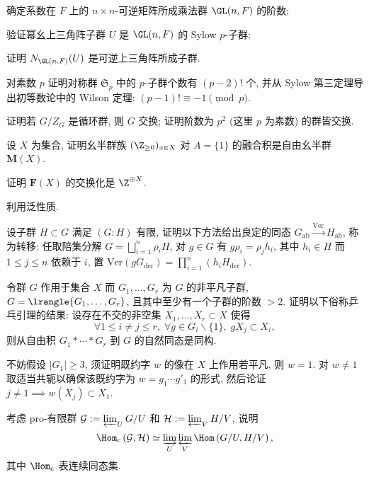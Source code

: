 \begin{Exercises}
		\begin{compactenum}[(i)]
			\item 确定系数在 $F$ 上的 $n \times n$-可逆矩阵所成乘法群 $\GL(n, F)$ 的阶数;
			\item 验证幂幺上三角阵子群 $U$ 是 $\GL(n,F)$ 的 Sylow $p$-子群;
			\item 证明 $N_{\GL(n,F)}(U)$ 是可逆上三角阵所成子群.
		\end{compactenum}
	\item 对素数 $p$ 证明对称群 $\mathfrak{S}_p$ 中的 $p$-子群个数有 $(p-2)!$ 个, 并从 Sylow 第三定理导出初等数论中的 Wilson 定理: $(p-1)! \equiv -1 \pmod p$.
	\item 证明若 $G/Z_G$ 是循环群, 则 $G$ 交换; 证明阶数为 $p^2$ (这里 $p$ 为素数) 的群皆交换.
	\item 设 $X$ 为集合, 证明幺半群族 $(\Z_{\geq 0})_{x \in X}$ 对 $A=\{1\}$ 的融合积是自由幺半群 $\mathbf{M}(X)$.
	\item 证明 $\mathbf{F}(X)$ 的交换化是 $\Z^{\oplus X}$. \begin{hint} 利用泛性质. \end{hint}
	\item 设子群 $H \subset G$ 满足 $(G:H)$ 有限, 证明以下方法给出良定的同态 $G_\text{ab} \xrightarrow{\text{Ver}} H_\text{ab}$, 称为转移: 任取陪集分解 $G = \bigsqcup_{i=1}^n \rho_i H$, 对 $g \in G$ 有 $g \rho_i = \rho_j h_i$, 其中 $h_i \in H$ 而 $1 \leq j \leq n$ 依赖于 $i$, 置 $\text{Ver}(g G_\text{der}) = \prod_{i=1}^n \left( h_i H_\text{der}\right)$.
	\item 令群 $G$ 作用于集合 $X$ 而 $G_1, \ldots, G_r$ 为 $G$ 的非平凡子群, $G=\lrangle{G_1, \ldots, G_r}$, 且其中至少有一个子群的阶数 $> 2$. 证明以下俗称乒乓引理的结果: 设存在不交的非空集 $X_1, \ldots, X_r \subset X$ 使得
		\[ \forall 1 \leq i \neq j \leq r, \; \forall g \in G_i \smallsetminus \{1\}, \; g X_j \subset X_i, \]
		则从自由积 $G_1 \ast \cdots \ast G_r$ 到 $G$ 的自然同态是同构. \begin{hint} 不妨假设 $|G_1| \geq 3$, 须证明既约字 $w$ 的像在 $X$ 上作用若平凡, 则 $w=1$. 对 $w \neq 1$ 取适当共轭以确保该既约字为 $w = g_1 \cdots g'_1$ 的形式, 然后论证 $j \neq 1 \implies w(X_j) \subset X_1$.\end{hint}
	\item 考虑 pro-有限群 $\mathcal{G} := \varprojlim_U G/U$ 和 $\mathcal{H} := \varprojlim_V H/V$, 说明
		\[ \Hom_{\mathrm{c}}\left( \mathcal{G}, \mathcal{H} \right) \simeq \varinjlim_U \varprojlim_V \Hom\left(G/U, H/V \right), \]
		其中 $\Hom_{\mathrm{c}}$ 表连续同态集.
\end{Exercises}